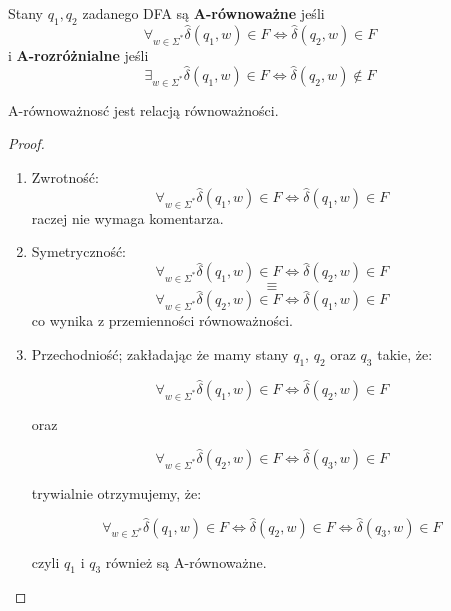 \begin{definition}
	Stany \( q_1, q_2 \) zadanego DFA są \textbf{A-równoważne} jeśli
	\[
		\forall_{w \in \Sigma^*} \hat \delta(q_1, w) \in F \iff \hat \delta(q_2, w) \in F
	\]
	i \textbf{A-rozróżnialne} jeśli
	\[
		\exists_{w \in \Sigma^*} \hat \delta(q_1, w) \in F \iff \hat \delta(q_2, w) \notin F
	\]
\end{definition}


\begin{lemma}
	A-równoważnosć jest relacją równoważności.
\end{lemma}
\begin{proof}
	\begin{enumerate}
		\item Zwrotność:
		      \[
			      \forall_{w \in \Sigma^*} \hat \delta(q_1, w) \in F \iff \hat \delta(q_1, w) \in F
		      \]
		      raczej nie wymaga komentarza.
		\item Symetryczność:
		      \[
			      \forall_{w \in \Sigma^*} \hat \delta(q_1, w) \in F \iff \hat \delta(q_2, w) \in F
		      \]
		      \[
			      \equiv
		      \]
		      \[
			      \forall_{w \in \Sigma^*} \hat \delta(q_2, w) \in F \iff \hat \delta(q_1, w) \in F
		      \]
		      co wynika z przemienności równoważności.
		\item Przechodniość; zakładając że mamy stany \(q_1\), \(q_2\) oraz \(q_3\) takie, że:

		      \[
			      \forall_{w \in \Sigma^*} \hat \delta(q_1, w) \in F \iff \hat \delta(q_2, w) \in F
		      \]

		      oraz

		      \[
			      \forall_{w \in \Sigma^*} \hat \delta(q_2, w) \in F \iff \hat \delta(q_3, w) \in F
		      \]

		      trywialnie otrzymujemy, że:

		      \[
			      \forall_{w \in \Sigma^*} \hat \delta(q_1, w) \in F \iff \hat \delta(q_2, w) \in F \iff \hat
			      \delta(q_3, w) \in F
		      \]

		      czyli \(q_1\) i \(q_3\) również są A-równoważne.
	\end{enumerate}
\end{proof}
